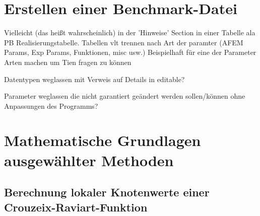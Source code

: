 \section{Erstellen einer Benchmark-Datei}
Vielleicht (das heißt wahrscheinlich) in der 'Hinweise' Section in einer
Tabelle ala PB Realisierungstabelle. Tabellen vlt trennen nach Art der paramter
(AFEM Params, Exp Params, Funktionen, misc usw.)
Beispielhaft für eine der Parameter Arten machen um Tien fragen zu können

Datentypen weglassen mit Verweis auf Details in editable?

Parameter weglassen die nicht garantiert geändert werden sollen/können ohne
Anpassungen des Programms?


\section{Mathematische Grundlagen ausgewählter Methoden}
\label{sec:mathematicalBasicsForMethods}


\subsection{Berechnung lokaler Knotenwerte einer Crouzeix-Raviart-Funktion}

